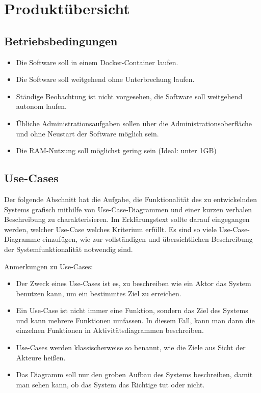 
\chapter{Produktübersicht}
\label{chap:product_overview}

\section{Betriebsbedingungen}
\begin{itemize}
    \item Die Software soll in einem \gls{Docker}-\gls{Container} laufen.
    \item Die Software soll weitgehend ohne Unterbrechung laufen.
    \item Ständige Beobachtung ist nicht vorgesehen, die Software soll weitgehend autonom laufen.
    \item Übliche Administrationsaufgaben sollen über die Administrationsoberfläche und ohne Neustart der Software möglich sein.
    \item Die \gls{RAM}-Nutzung soll möglichst gering sein (Ideal: unter 1GB)
\end{itemize}

\section{Use-Cases}

Der folgende Abschnitt hat die Aufgabe, die Funktionalität des zu entwickelnden
Systems grafisch mithilfe von Use-Case-Diagrammen und einer kurzen verbalen
Beschreibung zu charakterisieren. Im Erklärungstext sollte darauf eingegangen werden,
welcher Use-Case welches Kriterium erfüllt. Es sind so viele Use-Case-Diagramme einzufügen,
wie zur vollständigen und übersichtlichen Beschreibung der Systemfunktionalität
notwendig sind.

Anmerkungen zu Use-Cases:

\begin{itemize}
	\item Der Zweck eines Use-Cases ist es, zu beschreiben wie ein Aktor das System benutzen kann,
	 	um ein bestimmtes Ziel zu erreichen.
	\item Ein Use-Case ist nicht immer eine Funktion, sondern das Ziel des Systems und kann mehrere 
		Funktionen umfassen.
		In diesem Fall, kann man dann die einzelnen Funktionen in Aktivitätsdiagrammen beschreiben.
	\item Use-Cases werden klassischerweise so benannt, wie die Ziele aus Sicht der Akteure heißen.
	\item Das Diagramm soll nur den groben Aufbau des Systems beschreiben, damit man sehen kann,
		 ob das System das Richtige tut oder nicht.
\end{itemize}


